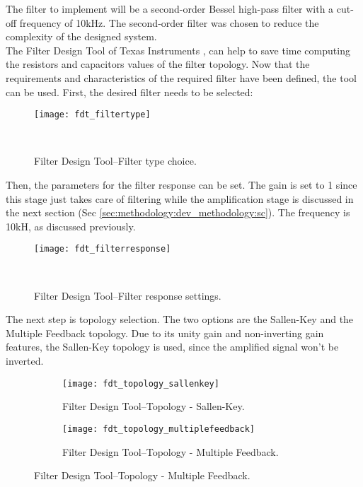 The filter to implement will be a second-order Bessel high-pass filter with a cut-off frequency of 10kHz. The second-order filter was chosen to reduce the complexity of the designed system. \\

The Filter Design Tool of Texas Instruments \cite{fdt}, can help to save time computing the resistors and capacitors values of the filter topology. Now that the requirements and characteristics of the required filter have been defined, the tool can be used. First, the desired filter needs to be selected:

\begin{figure}[H]
    \centering
    \texttt{[image: fdt\_filtertype]}
    \caption{Filter Design Tool--Filter type choice.}
~\label{fig:fdt_filtertype}
\end{figure}

Then, the parameters for the filter response can be set. The gain is set to 1 since this stage just takes care of filtering while the amplification stage is discussed in the next section (Sec \ref{sec:methodology:dev_methodology:sc}). The frequency is 10kH, as discussed previously.

\begin{figure}[H]
    \centering
    \texttt{[image: fdt\_filterresponse]}
    \caption{Filter Design Tool--Filter response settings.}
~\label{fig:fdt_filterresponse}
\end{figure}

The next step is topology selection. The two options are the Sallen-Key and the Multiple Feedback topology. Due to its unity gain and non-inverting gain features, the Sallen-Key topology is used, since the amplified signal won't be inverted.

\begin{figure}[H]
    \centering
    \begin{subfigure}[t]{1\textwidth}
        \centering
        \texttt{[image: fdt\_topology\_sallenkey]}
        \caption{Filter Design Tool--Topology - Sallen-Key.}
        \label{fig:fdt_topology:sallen-key}
    \end{subfigure}
    \begin{subfigure}[t]{1\textwidth}
        \centering
        \texttt{[image: fdt\_topology\_multiplefeedback]}
        \caption{Filter Design Tool--Topology - Multiple Feedback.}
        \label{fig:fdt_topology:multiple_feedback}
    \end{subfigure}
\end{figure}

